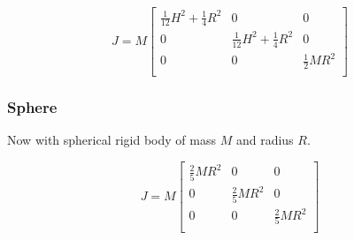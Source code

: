 \[ 
  J = M
  \begin{bmatrix}
    \frac{1}{12} H^2 + \frac{1}{4} R^2 & 0 & 0 \\    
    0 & \frac{1}{12} H^2 + \frac{1}{4} R^2 & 0 \\
    0 & 0 & \frac{1}{2} M R^2 \\
  \end{bmatrix}
\]


\subsubsection*{Sphere}
Now with spherical rigid body of mass $M$ and radius $R$.

\[ 
  J = M
  \begin{bmatrix}
    \frac{2}{5} M R^2 & 0 & 0 \\    
    0 & \frac{2}{5} M R^2 & 0 \\
    0 & 0 & \frac{2}{5} M R^2 \\
  \end{bmatrix}
\]